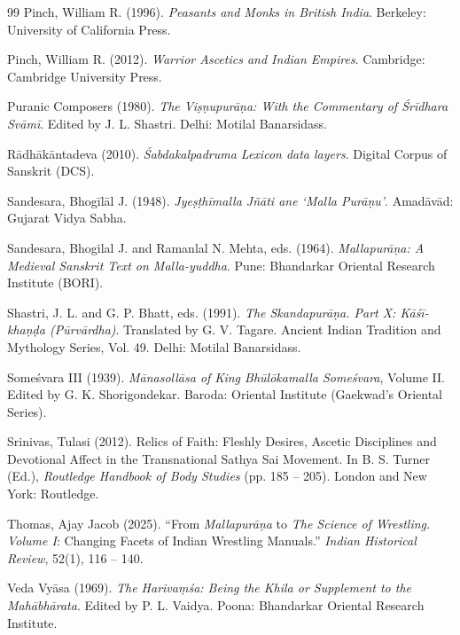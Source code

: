 \documentclass[11pt,twoside,letterpaper]{article}
\begin{document}
\begin{thebibliography}{99}
Pinch, William R. (1996). \textit{Peasants and Monks in British India}. Berkeley: University of California Press.

Pinch, William R. (2012). \textit{Warrior Ascetics and Indian Empires}. Cambridge: Cambridge University Press.

Puranic Composers (1980). \textit{The Viṣṇupurāṇa: With the Commentary of Śrīdhara Svāmī}. Edited by J. L. Shastri. Delhi: Motilal Banarsidass.

Rādhākāntadeva (2010). \textit{Śabdakalpadruma Lexicon data layers}. Digital Corpus of Sanskrit (DCS).

Sandesara, Bhogīlāl J. (1948). \textit{Jyeṣṭhīmalla Jñāti ane `Malla Purāṇu'}. Amadāvād: Gujarat Vidya Sabha.

Sandesara, Bhogilal J. and Ramanlal N. Mehta, eds. (1964). \textit{Mallapurāṇa: A Medieval Sanskrit Text on Malla-yuddha}. Pune: Bhandarkar Oriental Research Institute (BORI).

Shastri, J. L. and G. P. Bhatt, eds. (1991). \textit{The Skandapurāṇa. Part X: Kāśī-khaṇḍa (Pūrvārdha)}. Translated by G. V. Tagare. Ancient Indian Tradition and Mythology Series, Vol. 49. Delhi: Motilal Banarsidass.

Someśvara III (1939). \textit{Mānasollāsa of King Bhūlōkamalla Someśvara}, Volume II. Edited by G. K. Shorigondekar. Baroda: Oriental Institute (Gaekwad's Oriental Series).

Srinivas, Tulasi (2012). Relics of Faith: Fleshly Desires, Ascetic Disciplines and Devotional Affect in the Transnational Sathya Sai Movement. In B. S. Turner (Ed.), \textit{Routledge Handbook of Body Studies} (pp. 185 -- 205). London and New York: Routledge.

Thomas, Ajay Jacob (2025). ``From \textit{Mallapurāṇa} to \textit{The Science of Wrestling. Volume I}: Changing Facets of Indian Wrestling Manuals.'' \textit{Indian Historical Review}, 52(1), 116 -- 140.

Veda Vyāsa (1969). \textit{The Harivaṃśa: Being the Khila or Supplement to the Mahābhārata}. Edited by P. L. Vaidya. Poona: Bhandarkar Oriental Research Institute.


\end{thebibliography}
\end{document}
